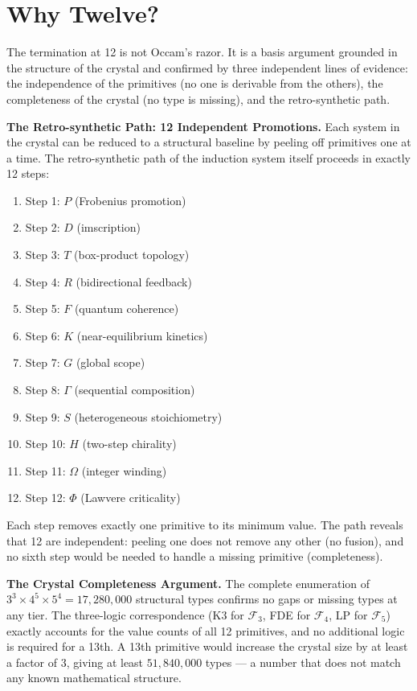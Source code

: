 \documentclass[12pt,a4paper]{article}
\begin{document}
\section{Why Twelve?}

The termination at 12 is not Occam's razor. It is a basis argument grounded in the structure of the crystal and confirmed by three independent lines of evidence: the independence of the primitives (no one is derivable from the others), the completeness of the crystal (no type is missing), and the retro-synthetic path.

\textbf{The Retro-synthetic Path: 12 Independent Promotions.}
Each system in the crystal can be reduced to a structural baseline by peeling off primitives one at a time. The retro-synthetic path of the induction system itself proceeds in exactly 12 steps:
\begin{enumerate}
    \item Step 1: $P$ (Frobenius promotion)
    \item Step 2: $D$ (imscription)
    \item Step 3: $T$ (box-product topology)
    \item Step 4: $R$ (bidirectional feedback)
    \item Step 5: $F$ (quantum coherence)
    \item Step 6: $K$ (near-equilibrium kinetics)
    \item Step 7: $G$ (global scope)
    \item Step 8: $\Gamma$ (sequential composition)
    \item Step 9: $S$ (heterogeneous stoichiometry)
    \item Step 10: $H$ (two-step chirality)
    \item Step 11: $\Omega$ (integer winding)
    \item Step 12: $\Phi$ (Lawvere criticality)
\end{enumerate}
Each step removes exactly one primitive to its minimum value. The path reveals that 12 are independent: peeling one does not remove any other (no fusion), and no sixth step would be needed to handle a missing primitive (completeness).

\textbf{The Crystal Completeness Argument.}
The complete enumeration of $3^3 \times 4^5 \times 5^4 = 17,280,000$ structural types confirms no gaps or missing types at any tier. The three-logic correspondence (K3 for $\mathcal{F}_3$, FDE for $\mathcal{F}_4$, LP for $\mathcal{F}_5$) exactly accounts for the value counts of all 12 primitives, and no additional logic is required for a 13th. A 13th primitive would increase the crystal size by at least a factor of 3, giving at least $51,840,000$ types --- a number that does not match any known mathematical structure.
\end{document}
